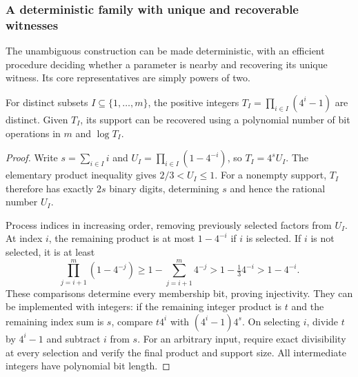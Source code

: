 \subsubsection{A deterministic family with unique and recoverable witnesses}
\label{sec:paired-powers-two}

The unambiguous construction can be made deterministic, with an efficient
procedure deciding whether a parameter is nearby and recovering its unique
witness. Its core representatives are simply powers of two.

\begin{lemma}\label{pd:integer-products}
For distinct subsets $I\subseteq\{1,\ldots,m\}$, the positive integers
$T_I=\prod_{i\in I}(4^i-1)$ are distinct. Given $T_I$, its support can
be recovered using a polynomial number of bit operations in $m$ and
$\log T_I$.
\end{lemma}
\begin{proof}
Write $s=\sum_{i\in I}i$ and
$U_I=\prod_{i\in I}(1-4^{-i})$, so $T_I=4^sU_I$. The elementary
product inequality gives $2/3<U_I\le1$. For a nonempty support,
$T_I$ therefore has exactly $2s$ binary digits, determining $s$ and
hence the rational number $U_I$.

Process indices in increasing order, removing previously selected factors
from $U_I$. At index $i$, the remaining product is at most $1-4^{-i}$
if $i$ is selected. If $i$ is not selected, it is at least
\[
 \prod_{j=i+1}^{m}(1-4^{-j})
 \ge1-\sum_{j=i+1}^{m}4^{-j}
 >1-\tfrac13 4^{-i}>1-4^{-i}.
\]
These comparisons determine every membership bit, proving injectivity.
They can be implemented with integers: if the remaining integer product
is $t$ and the remaining index sum is $s$, compare
$t4^i$ with $(4^i-1)4^s$. On selecting $i$, divide $t$ by $4^i-1$ and
subtract $i$ from $s$. For an arbitrary input, require exact divisibility
at every selection and verify the final product and support size.
All intermediate integers have polynomial bit length.
\end{proof}


